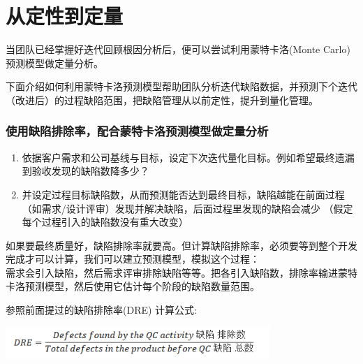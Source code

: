 \chapter{从定性到定量} %

当团队已经掌握好迭代回顾根因分析后，便可以尝试利用蒙特卡洛(Monte
Carlo)预测模型做定量分析。

下面介绍如何利用蒙特卡洛预测模型帮助团队分析迭代缺陷数据，并预测下个迭代（改进后）的过程缺陷范围，把缺陷管理从以前定性，提升到量化管理。

\hypertarget{ux4f7fux7528ux7f3aux9677ux6392ux9664ux7387ux914dux5408ux8499ux5730ux5361ux7f57ux9884ux6d4bux6a21ux578bux505aux5b9aux91cfux5206ux6790}{%
\subsection{使用缺陷排除率，配合蒙特卡洛预测模型做定量分析}\label{ux4f7fux7528ux7f3aux9677ux6392ux9664ux7387ux914dux5408ux8499ux5730ux5361ux7f57ux9884ux6d4bux6a21ux578bux505aux5b9aux91cfux5206ux6790}}

\begin{enumerate}
\tightlist
\item
  依据客户需求和公司基线与目标，设定下次迭代量化目标。例如希望最终遗漏到验收发现的缺陷数降多少？
\item
  并设定过程目标缺陷数，从而预测能否达到最终目标，缺陷越能在前面过程（如需求/设计评审）发现并解决缺陷，后面过程里发现的缺陷会减少
  （假定每个过程引入的缺陷数没有重大改变）
\end{enumerate}

如果要最终质量好，缺陷排除率就要高。但计算缺陷排除率，必须要等到整个开发完成才可以计算，我们可以建立预测模型，模拟这个过程：\\
需求会引入缺陷，然后需求评审排除缺陷等等。把各引入缺陷数，排除率输进蒙特卡洛预测模型，然后使用它估计每个阶段的缺陷数量范围。

参照前面提过的缺陷排除率(DRE) 计算公式:


\includegraphics[width=10cm]{Ma3_10.png}


